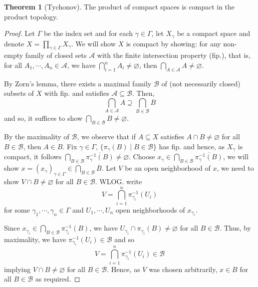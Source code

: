 \documentclass[]{article}
\theoremstyle{definition}
\newtheorem{theorem}{Theorem}
\begin{document}
\begin{theorem}[Tychonov]
  The product of compact spaces is compact in the product topology.
\end{theorem}
\begin{proof}
  Let \(\Gamma\) be the index set and for each \(\gamma \in \Gamma\), let \(X_\gamma\) be a 
  compact space and denote \(X = \prod_{\gamma \in \Gamma} X_\gamma\). We will show \(X\) is 
  compact by showing: for any non-empty family of closed sets \(\mathcal{A}\) with the 
  finite intersection property (fip.), that is, for all \(A_1, \cdots, A_n \in \mathcal{A}\),
  we have \(\bigcap_{i = 1}^n A_i \neq \varnothing\), then \(\bigcap_{A \in \mathcal{A}} A \neq \varnothing\). 

  By Zorn's lemma, there exists a maximal family \(\mathcal{B}\) of (not necessarily closed) subsets of 
  \(X\) with fip. and satisfies \(\mathcal{A} \subseteq \mathcal{B}\). Then, 
  \[\bigcap_{A \in \mathcal{A}} A \supseteq \bigcap_{B \in \mathcal{B}} B\]
  and so, it suffices to show \(\bigcap_{B \in \mathcal{B}} B \neq \varnothing\).

  By the maximality of \(\mathcal{B}\), we observe that if \(A \subseteq X\) satisfies 
  \(A \cap B \neq \varnothing\) for all \(B \in \mathcal{B}\), then \(A \in B\). 
  Fix \(\gamma \in \Gamma\), \(\{\pi_\gamma(B) \mid B \in \mathcal{B}\}\) has fip. and 
  hence, as \(X_\gamma\) is compact, it follows 
  \(\bigcap_{B \in \mathcal{B}} \overline{\pi_{\gamma}^{-1}(B)} \neq \varnothing\).
  Choose \(x_\gamma \in \bigcap_{B \in \mathcal{B}} \overline{\pi_{\gamma}^{-1}(B)}\), 
  we will show \(x = (x_\gamma)_{\gamma \in \Gamma} \in \bigcap_{B \in \mathcal{B}} \overline{B}\).
  Let \(V\) be an open neighborhood of \(x\), we need to show \(V \cap B \neq \varnothing\) for all 
  \(B \in \mathcal{B}\). WLOG. write 
  \[V = \bigcap_{i = 1}^n \pi^{-1}_{\gamma_i}(U_i)\]
  for some \(\gamma_1, \cdots, \gamma_n \in \Gamma\) and \(U_1, \cdots, U_n\) open neighborhoods of
  \(x_{\gamma_i}\).

  Since \(x_{\gamma_i} \in \bigcap_{B \in \mathcal{B}} \pi_{\gamma_i}^{-1}(B)\), we have
  \(U_{\gamma_i} \cap \pi_{\gamma_i}(B) \neq \varnothing\) for all \(B \in \mathcal{B}\). 
  Thus, by maximality, we have \(\pi_{\gamma_i}^{-1}(U_i) \in \mathcal{B}\) and so 
  \[V = \bigcap_{i = 1}^n \pi_{\gamma_i}^{-1}(U_i) \in \mathcal{B}\]
  implying \(V \cap B \neq \varnothing\) for all \(B \in \mathcal{B}\). Hence, as \(V\) was chosen 
  arbitrarily, \(x \in B\) for all \(B \in \mathcal{B}\) as required.
\end{proof}
\end{document}
